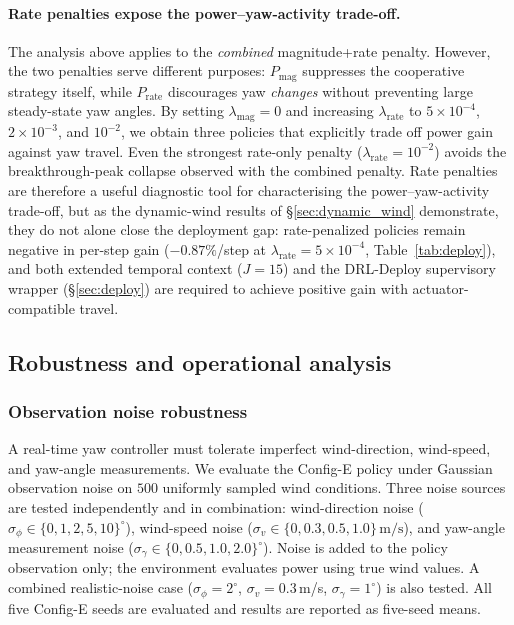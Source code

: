 \documentclass[final,5p,times]{elsarticle}
\begin{document}
\paragraph{Rate penalties expose the power--yaw-activity trade-off.}
The analysis above applies to the \emph{combined} magnitude+rate penalty.
However, the two penalties serve different purposes: $P_\mathrm{mag}$
suppresses the cooperative strategy itself, while $P_\mathrm{rate}$
discourages yaw \emph{changes} without preventing large steady-state yaw
angles. By setting $\lambda_\mathrm{mag}\!=\!0$ and increasing
$\lambda_\mathrm{rate}$ to $5{\times}10^{-4}$, $2{\times}10^{-3}$, and
$10^{-2}$, we obtain three policies that explicitly trade off power gain
against yaw travel. Even the strongest rate-only penalty
($\lambda_\mathrm{rate}\!=\!10^{-2}$) avoids the breakthrough-peak collapse
observed with the combined penalty. Rate penalties are therefore a useful
diagnostic tool for characterising the power--yaw-activity trade-off, but
as the dynamic-wind results of \S\ref{sec:dynamic_wind} demonstrate, they
do not alone close the deployment gap: rate-penalized policies remain
negative in per-step gain ($-0.87\%$/step at $\lambda_\mathrm{rate}{=}5{\times}10^{-4}$,
Table~\ref{tab:deploy}), and both extended temporal context ($J{=}15$) and
the DRL-Deploy supervisory wrapper (\S\ref{sec:deploy}) are required to
achieve positive gain with actuator-compatible travel.



\subsection{Robustness and operational analysis}\label{sec:robustness}

\subsubsection{Observation noise robustness}
A real-time yaw controller must tolerate imperfect wind-direction, wind-speed, and yaw-angle measurements. We evaluate the Config-E policy under Gaussian observation noise on $500$ uniformly sampled wind conditions. Three noise sources are tested independently and in combination: wind-direction noise ($\sigma_\phi\!\in\!\{0,1,2,5,10\}^\circ$), wind-speed noise ($\sigma_v\!\in\!\{0,0.3,0.5,1.0\}\,\mathrm{m/s}$), and yaw-angle measurement noise ($\sigma_\gamma\!\in\!\{0,0.5,1.0,2.0\}^\circ$). Noise is added to the policy observation only; the environment evaluates power using true wind values. A combined realistic-noise case ($\sigma_\phi{=}2^\circ$, $\sigma_v{=}0.3$\,m/s, $\sigma_\gamma{=}1^\circ$) is also tested. All five Config-E seeds are evaluated and results are reported as five-seed means.
\end{document}
